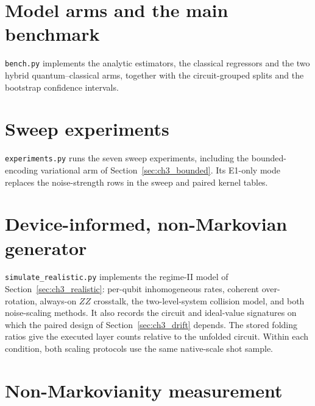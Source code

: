 

\section{Model arms and the main benchmark}

\texttt{bench.py} implements the analytic estimators, the classical regressors and
the two hybrid quantum--classical arms, together with the circuit-grouped splits and
the bootstrap confidence intervals.



\section{Sweep experiments}

\texttt{experiments.py} runs the seven sweep experiments, including the
bounded-encoding variational arm of Section~\ref{sec:ch3_bounded}.
Its E1-only mode replaces the noise-strength rows in the sweep and paired
kernel tables.



\section{Device-informed, non-Markovian generator}

\texttt{simulate\_realistic.py} implements the regime-II model of
Section~\ref{sec:ch3_realistic}: per-qubit inhomogeneous rates, coherent
over-rotation, always-on $ZZ$ crosstalk, the two-level-system collision model, and
both noise-scaling methods. It also records the circuit and ideal-value signatures
on which the paired design of Section~\ref{sec:ch3_drift} depends.
The stored folding ratios give the executed layer counts relative to the
unfolded circuit. Within each condition, both scaling protocols use the
same native-scale shot sample.



\section{Non-Markovianity measurement}

